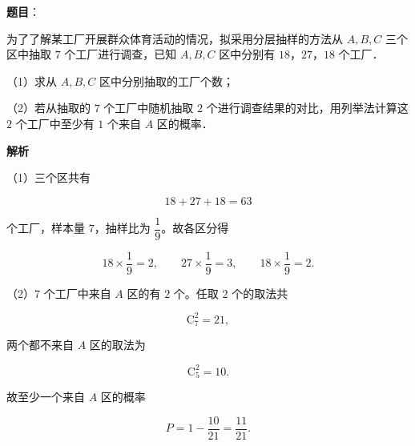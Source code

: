 \begin{answer}

\textbf{题目}：

为了了解某工厂开展群众体育活动的情况，拟采用分层抽样的方法从 $A,B,C$ 三个区中抽取 $7$ 个工厂进行调查，已知 $A,B,C$ 区中分别有 $18$，$27$，$18$ 个工厂．

（1）求从 $A,B,C$ 区中分别抽取的工厂个数；

（2）若从抽取的 $7$ 个工厂中随机抽取 $2$ 个进行调查结果的对比，用列举法计算这 $2$ 个工厂中至少有 $1$ 个来自 $A$ 区的概率．

\textbf{解析}

（1）三个区共有

\nopagebreak[4]
\[18+27+18=63\]

个工厂，样本量 $7$，抽样比为 $\dfrac19$。故各区分得

\nopagebreak[4]
\[18\times\frac19=2,\qquad 27\times\frac19=3,\qquad 18\times\frac19=2 .\]

（2）$7$ 个工厂中来自 $A$ 区的有 $2$ 个。任取 $2$ 个的取法共

\nopagebreak[4]
\[\mathrm C_7^2=21,\]

两个都不来自 $A$ 区的取法为

\nopagebreak[4]
\[\mathrm C_5^2=10 .\]

故至少一个来自 $A$ 区的概率

\nopagebreak[4]
\[P=1-\frac{10}{21}=\frac{11}{21} .\]


\end{answer}
